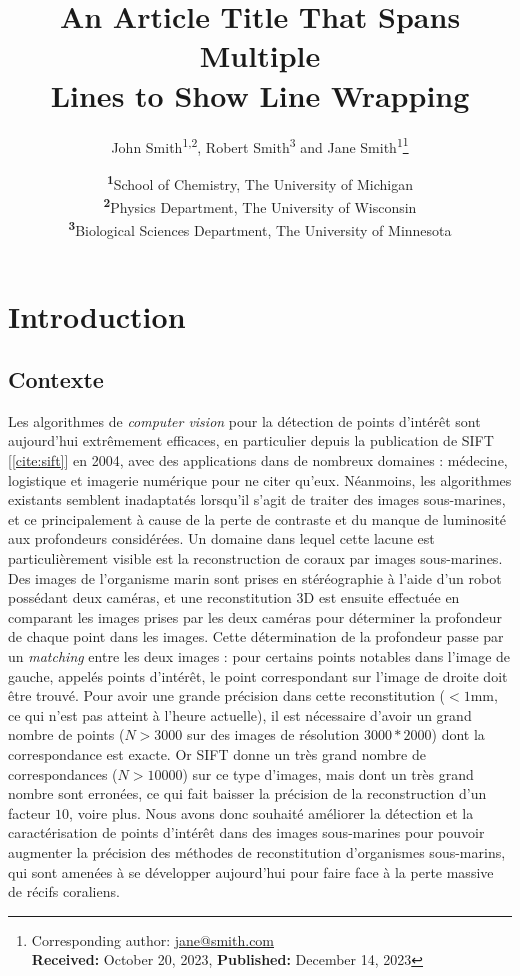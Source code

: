 \documentclass[
	a4paper, %
	10pt, %
	unnumberedsections, %
	twoside, %
]{LTJournalArticle}
\title{An Article Title That Spans Multiple\\ Lines to Show Line Wrapping} %
\author{%
	John Smith\textsuperscript{1,2}, Robert Smith\textsuperscript{3} and Jane Smith\textsuperscript{1}\thanks{Corresponding author: \href{mailto:jane@smith.com}{jane@smith.com}\\ \textbf{Received:} October 20, 2023, \textbf{Published:} December 14, 2023}
}
\date{\footnotesize\textsuperscript{\textbf{1}}School of Chemistry, The University of Michigan\\ \textsuperscript{\textbf{2}}Physics Department, The University of Wisconsin\\ \textsuperscript{\textbf{3}}Biological Sciences Department, The University of Minnesota}
\begin{document}
\maketitle %


\section{Introduction}

\subsection{Contexte}

Les algorithmes de \textit{computer vision} pour la détection de points d'intérêt sont aujourd'hui extrêmement efficaces, en particulier depuis la publication de SIFT [\ref{cite:sift}] en 2004, avec des applications dans de nombreux domaines : médecine, logistique et imagerie numérique pour ne citer qu'eux.
Néanmoins, les algorithmes existants semblent inadaptatés lorsqu'il s'agit de traiter des images sous-marines, et ce principalement à cause de la perte de contraste et du manque de luminosité aux profondeurs considérées.
Un domaine dans lequel cette lacune est particulièrement visible est la reconstruction de coraux par images sous-marines. Des images de l'organisme marin sont prises en stéréographie à l'aide d'un robot possédant deux caméras, et une reconstitution 3D est ensuite effectuée en comparant les images prises par les deux caméras pour déterminer la profondeur de chaque point dans les images.
Cette détermination de la profondeur passe par un \textit{matching} entre les deux images : pour certains points notables dans l'image de gauche, appelés points d'intérêt, le point correspondant sur l'image de droite doit être trouvé.
Pour avoir une grande précision dans cette reconstitution ($< 1$mm, ce qui n'est pas atteint à l'heure actuelle), il est nécessaire d'avoir un grand nombre de points ($N > 3000$ sur des images de résolution $3000 * 2000$) dont la correspondance est exacte.
Or SIFT donne un très grand nombre de correspondances ($N > 10 000$) sur ce type d'images, mais dont un très grand nombre sont erronées, ce qui fait baisser la précision de la reconstruction d'un facteur $10$, voire plus.
Nous avons donc souhaité améliorer la détection et la caractérisation de points d'intérêt dans des images sous-marines pour pouvoir augmenter la précision des méthodes de reconstitution d'organismes sous-marins, qui sont amenées à se développer aujourd'hui pour faire face à la perte massive de récifs coraliens.
\end{document}
